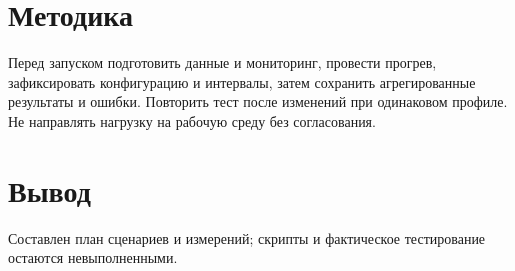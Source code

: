 \documentclass[14pt,a4paper]{extarticle}
\begin{document}
\section{Методика}
Перед запуском подготовить данные и мониторинг, провести прогрев, зафиксировать конфигурацию и интервалы, затем сохранить агрегированные результаты и ошибки. Повторить тест после изменений при одинаковом профиле. Не направлять нагрузку на рабочую среду без согласования.
\section{Вывод}
Составлен план сценариев и измерений; скрипты и фактическое тестирование остаются невыполненными.
\end{document}
